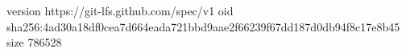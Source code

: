 version https://git-lfs.github.com/spec/v1
oid sha256:4ad30a18df0cea7d664eada721bbd9aae2f66239f67dd187d0db94f8c17e8b45
size 786528
